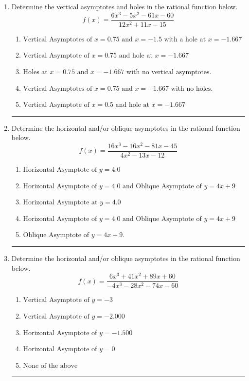 \documentclass[14pt]{extbook}
\newcommand{\litem}[1]{\item#1\hspace*{-1cm}\rule{\textwidth}{0.4pt}}
\begin{document}
\begin{enumerate}
{\begin{enumerate}[label=\Alph*.]
\end{enumerate} }
\litem{
Determine the vertical asymptotes and holes in the rational function below.\[ f(x) = \frac{6x^{3} -5 x^{2} -61 x -60}{12x^{2} +11 x -15} \]\begin{enumerate}[label=\Alph*.]
\item \( \text{Vertical Asymptotes of } x = 0.75 \text{ and } x = -1.5 \text{ with a hole at } x = -1.667 \)
\item \( \text{Vertical Asymptote of } x = 0.75 \text{ and hole at } x = -1.667 \)
\item \( \text{Holes at } x = 0.75 \text{ and } x = -1.667 \text{ with no vertical asymptotes.} \)
\item \( \text{Vertical Asymptotes of } x = 0.75 \text{ and } x = -1.667 \text{ with no holes.} \)
\item \( \text{Vertical Asymptote of } x = 0.5 \text{ and hole at } x = -1.667 \)

\end{enumerate} }
\litem{
Determine the horizontal and/or oblique asymptotes in the rational function below.\[ f(x) = \frac{16x^{3} -16 x^{2} -81 x -45}{4x^{2} -13 x -12} \]\begin{enumerate}[label=\Alph*.]
\item \( \text{Horizontal Asymptote of } y = 4.0  \)
\item \( \text{Horizontal Asymptote of } y = 4.0 \text{ and Oblique Asymptote of } y = 4x + 9 \)
\item \( \text{Horizontal Asymptote at } y = 4.0 \)
\item \( \text{Horizontal Asymptote of } y = 4.0 \text{ and Oblique Asymptote of } y = 4x + 9 \)
\item \( \text{Oblique Asymptote of } y = 4x + 9. \)

\end{enumerate} }
\litem{
Determine the horizontal and/or oblique asymptotes in the rational function below.\[ f(x) = \frac{6x^{3} +41 x^{2} +89 x + 60}{-4x^{3} -28 x^{2} -74 x -60} \]\begin{enumerate}[label=\Alph*.]
\item \( \text{Vertical Asymptote of } y = -3  \)
\item \( \text{Vertical Asymptote of } y = -2.000  \)
\item \( \text{Horizontal Asymptote of } y = -1.500  \)
\item \( \text{Horizontal Asymptote of } y = 0  \)
\item \( \text{None of the above} \)


\end{enumerate}}
\end{enumerate}
\end{document}
